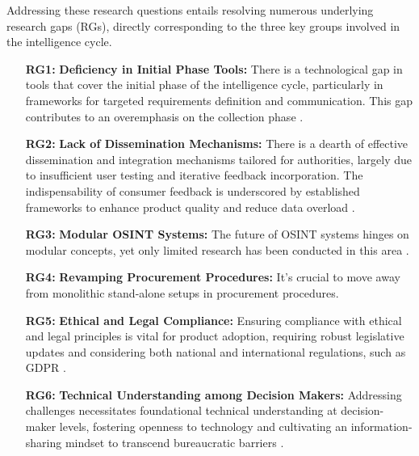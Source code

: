 \documentclass[10pt]{article}
\begin{document}
Addressing these research questions entails resolving numerous underlying research gaps (RGs), directly corresponding to the three key groups involved in the intelligence cycle.

\begin{itemize}
    \item[\textbf{RG1:}] \textbf{Deficiency in Initial Phase Tools:} There is a technological gap in tools that cover the initial phase of the intelligence cycle, particularly in frameworks for targeted requirements definition and communication. This gap contributes to an overemphasis on the collection phase \cite{Lowenthal.2020}.
    
    \item[\textbf{RG2:}] \textbf{Lack of Dissemination Mechanisms:} There is a dearth of effective dissemination and integration mechanisms tailored for authorities, largely due to insufficient user testing and iterative feedback incorporation. The indispensability of consumer feedback is underscored by established frameworks to enhance product quality and reduce data overload \cite{DirectorofNationalIntelligence.2011,JointChiefsofStaffU.S.Army.2013,NorthAtlanticTreatyOrganization.2001,Gibson.2016,Day.2016}.
    
    \item[\textbf{RG3:}] \textbf{Modular OSINT Systems:} The future of OSINT systems hinges on modular concepts, yet only limited research has been conducted in this area \cite{Arjun.2020,Wright.2020}.
    
    \item[\textbf{RG4:}] \textbf{Revamping Procurement Procedures:} It's crucial to move away from monolithic stand-alone setups in procurement procedures.
    
    \item[\textbf{RG5:}] \textbf{Ethical and Legal Compliance:} Ensuring compliance with ethical and legal principles is vital for product adoption, requiring robust legislative updates and considering both national and international regulations, such as GDPR \cite{EuropeanParliament.2016,EuropeanCommission.18.08.2023,Ghioni.2023,Wittmer.2022}.
    
    \item[\textbf{RG6:}] \textbf{Technical Understanding among Decision Makers:} Addressing challenges necessitates foundational technical understanding at decision-maker levels, fostering openness to technology and cultivating an information-sharing mindset to transcend bureaucratic barriers \cite{NorthAtlanticTreatyOrganization.2001}.
    

\end{itemize}
\end{document}
